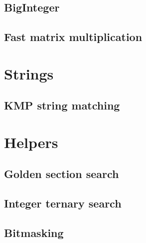 \documentclass[a4paper]{article}
\newcommand{\includesnippet}[2]{

}
\begin{document}
    \subsection{BigInteger}
    
    \subsection{Fast matrix multiplication}
    
  \section{Strings}
  
    \subsection{KMP string matching}
    
  \section{Helpers}
  
    \subsection{Golden section search}
    \includesnippet{snippets/goldensectionsearch.cpp}{C++}
    
    \subsection{Integer ternary search}
    
    \subsection{Bitmasking}
    \includesnippet{snippets/bitmasking.cpp}{C++}
    
\end{document}

